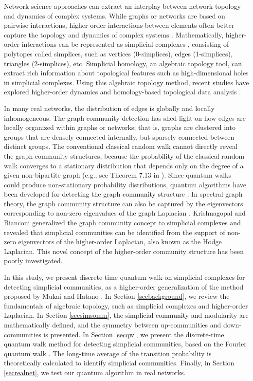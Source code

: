 \documentclass[10pt, letterpaper]{article}
\begin{document}
Network science approaches can extract an interplay between network topology and dynamics of complex systems. While graphs or networks are based on pairwise interactions, higher-order interactions between elements often better capture the topology and dynamics of complex systems \cite{Giusti2016}. Mathematically, higher-order interactions can be represented as simplicial complexes \cite{Hatcher2002, Jonsson2008}, consisting of polytopes called simplices, such as vertices (0-simplices), edges (1-simplices), triangles (2-simplices), etc. Simplicial homology, an algebraic topology tool, can extract rich information about topological features such as high-dimensional holes in simplicial complexes. Using this algebraic topology method, recent studies have explored higher-order dynamics \cite{Millan2020} and homology-based topological data analysis \cite{Song2023, Vipond2021}.

In many real networks, the distribution of edges is globally and locally inhomogeneous. The graph community detection \cite{Girvan2002, Newman2006} has shed light on how edges are locally organized within graphs or networks; that is, graphs are clustered into groups that are densely connected internally, but sparsely connected between distinct groups. The conventional classical random walk cannot directly reveal the graph community structures, because the probability of the classical random walk converges to a stationary distribution that depends only on the degree of a given non-bipartite graph (e.g., see Theorem 7.13 in \cite{Mitzenmacher2005}). Since quantum walks could produce non-stationary probability distributions, quantum algorithms have been developed for detecting the graph community structure \cite{Faccin2014, Mukai2020}. In spectral graph theory, the graph community structure can also be captured by the eigenvectors corresponding to non-zero eigenvalues of the graph Laplacian \cite{Newman2013}. Krishnagopal and Bianconi \cite{Krishnagopal2021} generalized the graph community concept to simplicial complexes and revealed that simplicial communities can be identified from the support of non-zero eigenvectors of the higher-order Laplacian, also known as the Hodge Laplacian. This novel concept of the higher-order community structure has been poorly investigated.

In this study, we present discrete-time quantum walk on simplicial complexes for detecting simplicial communities, as a higher-order generalization of the method proposed by Mukai and Hatano \cite{Mukai2020}. In Section \ref{secbackground}, we review the fundamentals of algebraic topology, such as simplicial complexes and higher-order Laplacian. In Section \ref{secsimsomm}, the simplicial community and modularity are mathematically defined, and the symmetry between up-communities and down-communities is presented. In Section \ref{secqw}, we present the discrete-time quantum walk method for detecting simplicial communities, based on the Fourier quantum walk \cite{Mackay2002, Saito2019}. The long-time average of the transition probability is theoretically calculated to identify simplicial communities. Finally, in Section \ref{secrealnet}, we test our quantum algorithm in real networks.
\end{document}
